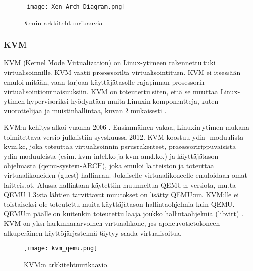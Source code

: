 
\begin{figure}[H]
\centering
\texttt{[image: Xen\_Arch\_Diagram.png]}
\caption{Xenin arkkitehtuurikaavio\cite{xen_overview}.}
\label{kuva_xen}
\end{figure}

\subsubsection{KVM}
KVM (Kernel Mode Virtualization) on Linux-ytimeen rakennettu tuki virtualisoinnille. KVM vaatii prosessorilta virtualisointituen. KVM ei itsessään emuloi mitään, vaan tarjoaa käyttäjätasolle rajapinnan prosessorin virtualisointiominaisuuksiin. KVM on toteutettu siten, että se muuttaa Linux-ytimen hypervisoriksi hyödyntäen muita Linuxin komponentteja, kuten vuorottelijaa ja muistinhallintaa, kuvan \ref{kuva_kvm} mukaisesti \cite{kvm1}.

KVM:n kehitys alkoi vuonna 2006 \cite{kvm3}. Ensimmäinen vakaa, Linuxin ytimen mukana toimitettava versio julkaistiin syyskuussa 2012. KVM koostuu ydin -moduulista kvm.ko, joka toteuttaa virtualisoinnin perusrakenteet, prosessoririppuvaisista ydin-moduuleista (esim. kvm-intel.ko ja kvm-amd.ko.) ja käyttäjätason ohjelmasta (qemu-system-ARCH), joka emuloi laitteiston ja toteuttaa virtuaalikoneiden (guest) hallinnan. Jokaiselle virtuaalikoneelle emuloidaan omat laitteistot. Alussa hallintaan käytettiin muunneltua QEMU:n versiota, mutta QEMU 1.3:sta lähtien tarvittavat muutokset on lisätty QEMU:un. KVM:lle ei toistaiseksi ole toteutettu muita käyttäjätason hallintaohjelmia kuin QEMU. QEMU:n päälle on kuitenkin toteutettu laaja joukko hallintaohjelmia (libvirt) \cite{kvm2}. KVM on yksi harkinnanarvoinen virtuaalikone, jos ajoneuvotietokoneen alkuperäinen käyttöjärjestelmä täytyy saada virtualisoitua.


\begin{figure}[H]
\centering
\texttt{[image: kvm\_qemu.png]}
\caption{KVM:n arkkitehtuurikaavio.\cite{kvm4}}
\label{kuva_kvm}
\end{figure}

